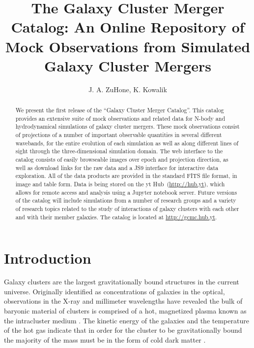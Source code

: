 \documentclass{emulateapj}
\begin{document}
\title{The Galaxy Cluster Merger Catalog: An Online Repository of Mock Observations from Simulated Galaxy Cluster Mergers}

\author{J. A. ZuHone, K. Kowalik}


\begin{abstract}
We present the first release of the ``Galaxy Cluster Merger Catalog''. This catalog provides an extensive suite of mock observations and related data for N-body and hydrodynamical simulations of galaxy cluster mergers. These mock observations consist of projections of a number of important observable quantities in several different wavebands, for the entire evolution of each simulation as well as along different lines of sight through the three-dimensional simulation domain. The web interface to the catalog consists of easily browseable images over epoch and projection direction, as well as download links for the raw data and a JS9 interface for interactive data exploration. All of the data products are provided in the standard FITS file format, in image and table form. Data is being stored on the yt Hub~(\url{http://hub.yt}), which allows for remote access and analysis using a Jupyter notebook server. Future versions of the catalog will include simulations from a number of research groups and a variety of research topics related to the study of interactions of galaxy clusters with each other and with their member galaxies. The catalog is located at \url{http://gcmc.hub.yt}.
\end{abstract}


\section{Introduction}\label{sec:intro}

Galaxy clusters are the largest gravitationally bound structures in the current universe. Originally identified as concentrations of galaxies in the optical, observations in the X-ray and millimeter wavelengths have revealed the bulk of baryonic material of clusters is comprised of a hot, magnetized plasma known as the intracluster medium \citep[ICM,][]{for72,sun72}. The kinetic energy of the galaxies and the temperature of the hot gas indicate that in order for the cluster to be gravitationally bound the majority of the mass must be in the form of cold dark matter \citep[CDM, first noted by][]{zwi37}.
\end{document}
